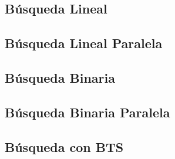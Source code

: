 \documentclass[12pt, fleqn]{article}                             %
\theoremstyle{break}                                            %
\begin{document}
    \clearpage
    \subsection{Búsqueda Lineal}

        

    \clearpage
    \subsection{Búsqueda Lineal Paralela}
        

    \clearpage
    \subsection{Búsqueda Binaria}

        

    \clearpage
    \subsection{Búsqueda Binaria Paralela}
        

    \clearpage
    \subsection{Búsqueda con BTS}
        
\end{document}
